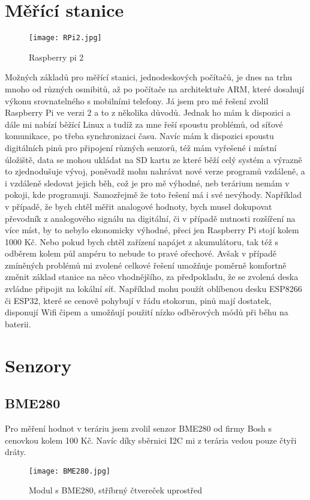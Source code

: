 
\section{Měřící stanice}
\begin{figure}[H]
    \centering
    \texttt{[image: RPi2.jpg]}
    \caption{Raspberry pi 2}
\end{figure}
Možných základů pro měřící stanici, jednodeskových počítačů, je dnes na trhu mnoho od různých osmibitů, až po počítače 
na architektuře ARM,  které dosahují výkonu srovnatelného s mobilními telefony. Já jsem pro mé řešení zvolil Raspberry 
Pi ve verzi 2 a to z několika důvodů. Jednak ho mám k dispozici a dále mi nabízí běžící Linux a tudíž za mne řeší 
spoustu problémů, od síťové komunikace, po třeba synchronizaci času. Navíc mám k dispozici spoustu digitálních pinů pro 
připojení různých senzorů, též mám vyřešené i místní úložiště, data se mohou ukládat na SD kartu ze které běží celý 
systém a výrazně to zjednodušuje vývoj, poněvadž mohu nahrávat nové verze programů vzdáleně, a i vzdáleně sledovat 
jejich běh, což je pro mě výhodné, neb terárium nemám v pokoji, kde programuji. Samozřejmě že toto řešení má i své 
nevýhody. Například v případě, že bych chtěl měřit analogové hodnoty, bych musel dokupovat převodník z analogového 
signálu na digitální, či v případě nutnosti rozšíření na více míst, by to nebylo ekonomicky výhodné, přeci jen Raspberry 
Pi stojí kolem 1000 Kč. Nebo pokud bych chtěl zařízení napájet z akumulátoru, tak též s odběrem kolem půl ampéru to 
nebude to pravé ořechové. Avšak v případě zmíněných problémů mi zvolené celkové řešení umožňuje poměrně komfortně změnit 
základ stanice na něco vhodnějšího, za předpokladu, že se zvolená deska zvládne připojit na lokální síť. Například mohu 
použít oblíbenou desku ESP8266 či ESP32, které se cenově pohybují v řádu stokorun, pinů mají dostatek, disponují Wifi 
čipem a umožňují použití nízko odběrových módů při běhu na baterii.

\section{Senzory}
\subsection{BME280}
Pro měření hodnot v teráriu jsem zvolil senzor BME280 od firmy Bosh s cenovkou kolem 100 Kč. Navíc díky sběrnici I2C mi 
z terária vedou pouze čtyři dráty.
\begin{figure}[H]
		\centering
    \texttt{[image: BME280.jpg]}
    \caption{Modul s BME280, stříbrný čtvereček uprostřed}
\end{figure}


